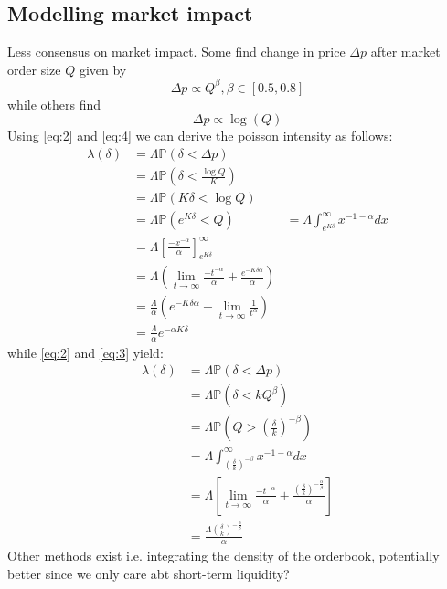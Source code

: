 \subsection*{Modelling market impact}
Less consensus on market impact. Some find change in price $\Delta p$ after market order size $Q$ given by 
\begin{equation}\label{eq:3}
    \Delta p\propto Q^\beta, \beta\in[0.5,0.8]
\end{equation}
while others find
\begin{equation}\label{eq:4}
    \Delta p\propto\log(Q)
\end{equation}
Using \ref{eq:2} and \ref{eq:4} we can derive the poisson intensity as follows:
\begin{align*}
    \lambda(\delta)&=\Lambda\mathbb{P}(\delta<\Delta p)\\
    &=\Lambda\mathbb{P}\left(\delta<\frac{\log Q}{K}\right)\\
    &=\Lambda\mathbb{P}(K\delta<\log Q)\\
    &=\Lambda\mathbb{P}\left(e^{K\delta}<Q\right)
    &=\Lambda\int_{e^{K\delta}}^{\infty}x^{-1-\alpha}dx\\
    &=\Lambda\left[\frac{-x^{-\alpha}}{\alpha}\right]_{e^{K\delta}}^\infty\\
    &=\Lambda\left(\lim_{t\rightarrow\infty}\frac{-t^{-\alpha}}{\alpha}+\frac{e^{-K\delta\alpha}}{\alpha}\right)\\
    &=\frac{\Lambda}{\alpha}\left(e^{-K\delta\alpha}-\lim_{t\rightarrow\infty}\frac{1}{t^\alpha}\right)\\
    &=\frac{\Lambda}{\alpha}e^{-\alpha K\delta}
\end{align*}
while \ref{eq:2} and \ref{eq:3} yield:
\begin{align*}
    \lambda(\delta)&=\Lambda\mathbb{P}(\delta<\Delta p)\\
    &=\Lambda\mathbb{P}(\delta<kQ^\beta)\\
    &=\Lambda\mathbb{P}\left(Q>\left(\frac{\delta}{k}\right)^{-\beta}\right)\\
    &=\Lambda\int_{\left(\frac{\delta}{k}\right)^{-\beta}}^\infty x^{-1-\alpha}dx\\
    &=\Lambda\left[\lim_{t\rightarrow\infty}\frac{-t^{-\alpha}}{\alpha}+\frac{\left(\frac{\delta}{k}\right)^{-\frac{\alpha}{\beta}}}{\alpha}\right]\\
    &=\frac{\Lambda\left(\frac{\delta}{k}\right)^{-\frac{\alpha}{\beta}}}{\alpha}
\end{align*}
Other methods exist i.e. integrating the density of the orderbook, potentially better since we only care abt short-term liquidity?

